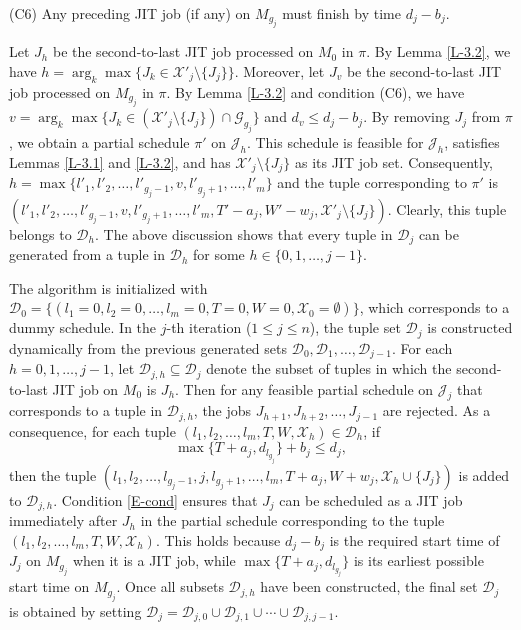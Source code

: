 \documentclass[12pt, eqno, limlimits]{article}
\begin{document}
\begin{sloppypar}
\begin{description}
            \item (C6) Any preceding JIT job (if any) on $M_{g_j}$ must finish by time $d_j-b_j$. 
        \end{description}
        Let $J_h$ be the second-to-last JIT job processed on $M_0$ in $\pi$. By Lemma \ref{L-3.2}, we have $h=\arg_k \max\{J_k \in \mathcal{X}'_j \setminus \{J_j\}\}$. Moreover, let $J_v$ be the second-to-last JIT job processed on $M_{g_j}$ in $\pi$. By Lemma \ref{L-3.2} and condition (C6), we have $v=\arg_k \max\{J_k \in (\mathcal{X}'_j \setminus \{J_j\}) \cap \mathcal{G}_{g_j}\}$ and  $d_v \leq d_j-b_j$. By removing $J_j$ from $\pi$, we obtain a partial schedule $\pi'$ on $\mathcal{J}_h$. This schedule is feasible for $\mathcal{J}_h$, satisfies Lemmas \ref{L-3.1} and \ref{L-3.2}, and has  $\mathcal{X}'_j \setminus \{J_j\}$ as its JIT job set. Consequently, $h=\max \{l'_1, l'_2, \ldots, l'_{g_j-1}, v, l'_{g_j+1}, \ldots, l'_m\}$ and the tuple corresponding to $\pi'$ is 
        $(l'_1, l'_2, \ldots, l'_{g_j-1}, v, l'_{g_j+1}, \ldots, l'_m, T'-a_j, W'-w_j, \mathcal{X}'_j \setminus \{J_j\})$. Clearly, this tuple belongs to $\mathcal{D}_h$. The above discussion shows that every tuple in $\mathcal{D}_j$ can be generated from a tuple in $\mathcal{D}_h$ for some $h \in \{0, 1,  \ldots, j-1\}$.
        
        The algorithm is initialized with $\mathcal{D}_0=\{(l_1=0, l_2=0, \ldots, l_m=0, T=0, W=0, \mathcal{X}_0=\emptyset)\}$, which corresponds to a dummy schedule. In the $j$-th iteration ($1 \leq j \leq n$), the tuple set $\mathcal{D}_j$ is constructed dynamically from the previous generated sets $\mathcal{D}_0, \mathcal{D}_{1}, \ldots, \mathcal{D}_{j-1}$. For each $h=0, 1, \ldots, j-1$, let $\mathcal{D}_{j,h} \subseteq \mathcal{D}_j$ denote the subset of tuples in which the second-to-last JIT job on $M_0$ is $J_h$. Then for any feasible partial schedule on $\mathcal{J}_j$ that corresponds to a tuple in $\mathcal{D}_{j,h}$, the jobs $J_{h+1}, J_{h+2}, \ldots, J_{j-1}$ are rejected. As a consequence, for each tuple $(l_1, l_2, \ldots, l_m, T, W, \mathcal{X}_h) \in \mathcal{D}_h$, if 
        \begin{equation} \label{E-cond}
            \max\{T+a_j, d_{l_{g_j}}\}+b_j \leq d_j,
        \end{equation} 
        then the tuple $(l_1, l_2, \ldots, l_{g_j-1}, j, l_{g_j+1}, \ldots, l_m, T+a_j, W+w_j, \mathcal{X}_h \cup \{J_j\})$ is added to $\mathcal{D}_{j,h}$. Condition \eqref{E-cond} ensures that $J_j$ can be scheduled as a JIT job immediately after $J_h$ in the partial schedule corresponding to the tuple $(l_1, l_2, \ldots, l_m, T, W, \mathcal{X}_h)$. This holds because $d_j-b_j$ is the required start time of $J_j$ on $M_{g_j}$ when it is a JIT job, while $\max\{T+a_j, d_{l_{g_j}}\}$ is its earliest possible start time on $M_{g_j}$. Once all subsets $\mathcal{D}_{j,h}$ have been constructed, the final set $\mathcal{D}_j$ is obtained by setting $\mathcal{D}_{j}=\mathcal{D}_{j,0} \cup \mathcal{D}_{j,1} \cup \cdots \cup \mathcal{D}_{j,j-1}$.
        

\end{sloppypar}
\end{document}
